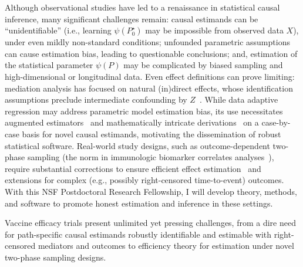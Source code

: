 Although observational studies have led to a renaissance in statistical causal
inference, many significant challenges remain: causal estimands can be
``unidentifiable''
(i.e., learning $\psi(P_0^{\star})$ may be impossible from observed data $X$),
under even mildly non-standard conditions; unfounded parametric assumptions can
cause estimation bias, leading to questionable conclusions; and, estimation of
the statistical parameter $\psi(P)$ may be complicated by biased sampling and
high-dimensional or longitudinal data. Even effect definitions can prove
limiting: mediation analysis has focused on natural (in)direct effects, whose
identification assumptions preclude intermediate confounding by
$Z$~\citep{petersen2006estimation, tchetgen2014identification,
miles2017partial, vanderweele2017mediation}.
While data adaptive regression may address parametric model estimation bias, its
use necessitates augmented estimators~\citep{pfanzagl1985contributions,
vdl2011targeted, vdl2018targeted, coyle2020targeted} and mathematically
intricate derivations~\citep{carone2018higher} on a case-by-case basis for novel
causal estimands,
motivating the dissemination of robust statistical software. Real-world
study designs, such as outcome-dependent two-phase sampling (the norm in
immunologic biomarker correlates analyses~\citep{haynes2012immune}), require
substantial corrections to ensure efficient effect
estimation~\citep{hejazi2020efficient} and extensions for complex (e.g.,
possibly right-censored time-to-event) outcomes. With this NSF Postdoctoral
Research Fellowship, I will develop theory, methods, and software to promote
honest estimation and inference in these settings.

Vaccine efficacy trials present unlimited yet pressing challenges, from a dire
need for path-specific causal estimands robustly identifiable and estimable with
right-censored mediators and outcomes to efficiency theory for estimation under
novel two-phase sampling designs.


